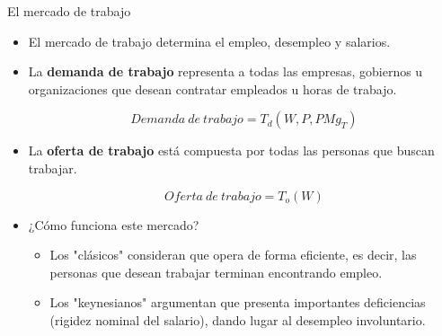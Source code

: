 \documentclass{beamer}
\begin{document}
\begin{frame}{El mercado de trabajo}
\begin{itemize}
    \item El mercado de trabajo determina el empleo, desempleo y salarios. \vspace{1mm}
    \item La \textbf{demanda de trabajo} representa a todas las empresas, gobiernos u organizaciones que desean contratar empleados u horas de trabajo. 
            \begin{center}
            \begin{tcolorbox}[width=3.5in,boxsep=0pt, left=0pt, right=0pt, top=0pt,colframe = blue!70!black, colback = blue!7!white]%
             $$ Demanda\: de \:trabajo= T_d (W, P, PMg_T)$$
             \end{tcolorbox}
             \end{center}
             \vspace{1mm} 
    \item La \textbf{oferta de trabajo} está compuesta por todas las personas que buscan trabajar. 
         \begin{center}
            \begin{tcolorbox}[width=3in, boxsep=0pt, left=0pt, right=0pt, top=2pt, ,colframe = blue!70!black, colback = blue!7!white]%
              $$Oferta\: de \:trabajo= T_o (W)$$
             \end{tcolorbox}
             \end{center}
             \vspace{1mm}
    \item ¿Cómo funciona este mercado?
    \begin{itemize}
        \item Los "clásicos" consideran que opera de forma eficiente, es decir, las personas que desean trabajar terminan encontrando empleo.
        \item Los "keynesianos" argumentan que presenta importantes deficiencias (rigidez nominal del salario), dando lugar al desempleo involuntario.
    \end{itemize}
\end{itemize}
\end{frame}
\end{document}
